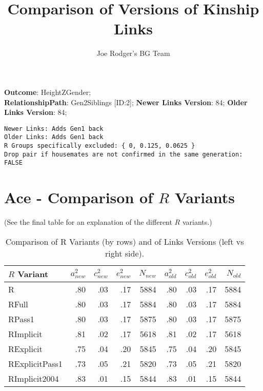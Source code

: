 \documentclass{article}\usepackage[]{graphicx}\usepackage[]{color}
\title{Comparison of Versions of Kinship Links}
\author{Joe Rodger's BG Team}
\makeatletter
\newenvironment{kframe}{%
 \def\at@end@of@kframe{}%
 \ifinner\ifhmode%
  \def\at@end@of@kframe{\end{minipage}}%
  \begin{minipage}{\columnwidth}%
 \fi\fi%
 \def\FrameCommand##1{\hskip\@totalleftmargin \hskip-\fboxsep
 \colorbox{shadecolor}{##1}\hskip-\fboxsep
     \hskip-\linewidth \hskip-\@totalleftmargin \hskip\columnwidth}%
 \MakeFramed {\advance\hsize-\width
   \@totalleftmargin\z@ \linewidth\hsize
   \@setminipage}}%
 {\par\unskip\endMakeFramed%
 \at@end@of@kframe}
\newenvironment{knitrout}{}{} %
\makeatother
\begin{document}
\maketitle
\setcounter{totalnumber}{8} %

\setlength{\parindent}{0pt}%











\textbf{Outcome}: HeightZGender;\\
\textbf{RelationshipPath}: Gen2Siblings [ID:2];
\textbf{Newer Links Version}: 84;
\textbf{Older Links Version}: 84;

\begin{knitrout}
\color{fgcolor}\begin{kframe}
\begin{verbatim}
Newer Links: Adds Gen1 back
Older Links: Adds Gen1 back
R Groups specifically excluded: { 0, 0.125, 0.0625 }
Drop pair if housemates are not confirmed in the same generation: FALSE
\end{verbatim}
\end{kframe}
\end{knitrout}





\section{Ace - Comparison of $R$ Variants} 
(See the final table for an explanation of the different $R$ variants.)
\begin{table}[ht]
\centering
{\large
\begin{tabular}{l|rrrr|rrrr}
  \hline
$R$ Variant & $a_{new}^2$ & $c_{new}^2$ & $e_{new}^2$ & $N_{new}$ & $a_{old}^2$ & $c_{old}^2$ & $e_{old}^2$ & $N_{old}$ \\ 
  \hline
R & .80 & .03 & .17 & 5884 & .80 & .03 & .17 & 5884 \\ 
  RFull & .80 & .03 & .17 & 5884 & .80 & .03 & .17 & 5884 \\ 
  RPass1 & .80 & .03 & .17 & 5875 & .80 & .03 & .17 & 5875 \\ 
  RImplicit & .81 & .02 & .17 & 5618 & .81 & .02 & .17 & 5618 \\ 
  RExplicit & .75 & .04 & .20 & 5845 & .75 & .04 & .20 & 5845 \\ 
  RExplicitPass1 & .73 & .05 & .21 & 5820 & .73 & .05 & .21 & 5820 \\ 
  RImplicit2004 & .83 & .01 & .15 & 5844 & .83 & .01 & .15 & 5844 \\ 
   \hline
\end{tabular}
}
\caption{Comparison of R Variants (by rows) and of Links Versions (left vs right side).} 
\end{table}
\end{document}
